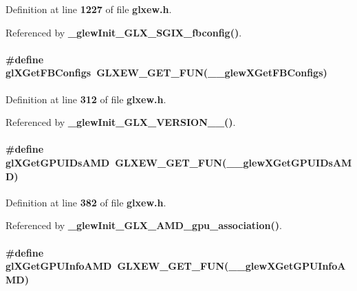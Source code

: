 Definition at line {\bf 1227} of file {\bf glxew.\+h}.



Referenced by {\bf \+\_\+glew\+Init\+\_\+\+G\+L\+X\+\_\+\+S\+G\+I\+X\+\_\+fbconfig()}.

\paragraph[{gl\+X\+Get\+F\+B\+Configs}]{\setlength{\rightskip}{0pt plus 5cm}\#define gl\+X\+Get\+F\+B\+Configs~{\bf G\+L\+X\+E\+W\+\_\+\+G\+E\+T\+\_\+\+F\+UN}({\bf \+\_\+\+\_\+glew\+X\+Get\+F\+B\+Configs})}\label{glxew_8h_aaf8ac97f39b34a9c07b942afe85727e3}


Definition at line {\bf 312} of file {\bf glxew.\+h}.



Referenced by {\bf \+\_\+glew\+Init\+\_\+\+G\+L\+X\+\_\+\+V\+E\+R\+S\+I\+O\+N\+\_\+\_()}.

\paragraph[{gl\+X\+Get\+G\+P\+U\+I\+Ds\+A\+MD}]{\setlength{\rightskip}{0pt plus 5cm}\#define gl\+X\+Get\+G\+P\+U\+I\+Ds\+A\+MD~{\bf G\+L\+X\+E\+W\+\_\+\+G\+E\+T\+\_\+\+F\+UN}({\bf \+\_\+\+\_\+glew\+X\+Get\+G\+P\+U\+I\+Ds\+A\+MD})}\label{glxew_8h_abcbc29c88caa3991f66bed6ce4a8ccad}


Definition at line {\bf 382} of file {\bf glxew.\+h}.



Referenced by {\bf \+\_\+glew\+Init\+\_\+\+G\+L\+X\+\_\+\+A\+M\+D\+\_\+gpu\+\_\+association()}.

\paragraph[{gl\+X\+Get\+G\+P\+U\+Info\+A\+MD}]{\setlength{\rightskip}{0pt plus 5cm}\#define gl\+X\+Get\+G\+P\+U\+Info\+A\+MD~{\bf G\+L\+X\+E\+W\+\_\+\+G\+E\+T\+\_\+\+F\+UN}({\bf \+\_\+\+\_\+glew\+X\+Get\+G\+P\+U\+Info\+A\+MD})}\label{glxew_8h_a853701feeb71dc8122dd82a1c8ca9879}


